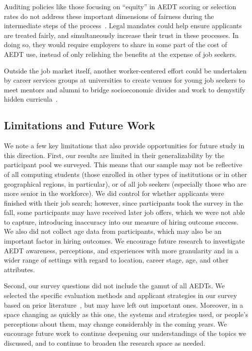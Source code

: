 Auditing policies like those focusing on ``equity'' in AEDT scoring or selection rates do not address these important dimensions of fairness during the intermediate steps of the process~\cite{locallaw144}. Legal mandates could help ensure applicants are treated fairly, and simultaneously increase their trust in these processes. In doing so, they would require employers to share in some part of the cost of AEDT use, instead of only relishing the benefits at the expense of job seekers. 

Outside the job market itself, another worker-centered effort could be undertaken by career services groups at universities  to create venues for young job seekers to meet mentors and alumni to bridge socioeconomic divides and work to demystify hidden curricula~\cite{nakai2023uncovering}.

\subsection{Limitations and Future Work}
We note a few key limitations that also provide opportunities for future study in this direction. First, our results are limited in their generalizability by the participant pool we surveyed. This means that our sample may not be reflective of all computing students (those enrolled in other types of institutions or in other geographical regions, in particular), or of all job seekers (especially those who are more senior in the workforce). We did control for whether applicants were finished with their job search; however, since participants took the survey in the fall,  some participants may have received later job offers, which we were not able to capture, introducing inaccuracy into our measure of hiring outcome success. We also did not collect age data from participants, which may also be an important factor in hiring outcomes. We encourage future research to investigate AEDT awareness, perceptions, and experiences with more granularity and in a wider range of settings with regard to location, career stage, age, and other attributes.

Second, our survey questions did not include the gamut of all AEDTs. We selected the specific evaluation methods and applicant strategies in our survey based on prior literature~\cite{armstrong2023navigating}, but may have left out important ones. Moreover, in a space changing as quickly as this one, the systems and strategies used, or people's perceptions about them, may change considerably in the coming years. We encourage future work to continue deepening our understandings of the topics we discussed, and to continue to broaden the research space as needed. 

